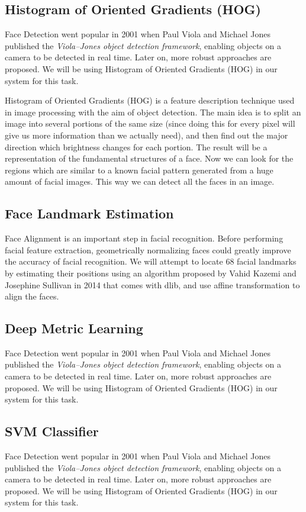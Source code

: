 \subsection{Histogram of Oriented Gradients (HOG)}
Face Detection went popular in 2001 when Paul Viola and Michael Jones published the \emph{Viola–Jones object detection framework},
enabling objects on a camera to be detected in real time. Later on, more robust approaches are proposed. We will be using
Histogram of Oriented Gradients (HOG) in our system for this task.

Histogram of Oriented Gradients (HOG) is a feature description technique used in image processing with the aim of object
detection. The main idea is to split an image into several portions of the same size (since doing this for every pixel will give
us more information than we actually need), and then find out the major direction which brightness changes for each portion.
The result will be a representation of the fundamental structures of a face. Now we can look for the regions which are
similar to a known facial pattern generated from a huge amount of facial images. This way we can detect all the faces
in an image.


\subsection{Face Landmark Estimation}
Face Alignment is an important step in facial recognition. Before performing facial feature extraction, geometrically
normalizing faces could greatly improve the accuracy of facial recognition. We will attempt to locate 68 facial landmarks
by estimating their positions using an algorithm proposed by Vahid Kazemi and Josephine Sullivan in 2014 that comes with dlib,
and use affine transformation to align the faces.

\subsection{Deep Metric Learning}
Face Detection went popular in 2001 when Paul Viola and Michael Jones published the \emph{Viola–Jones object detection framework},
enabling objects on a camera to be detected in real time. Later on, more robust approaches are proposed. We will be using
Histogram of Oriented Gradients (HOG) in our system for this task.

\subsection{SVM Classifier}
Face Detection went popular in 2001 when Paul Viola and Michael Jones published the \emph{Viola–Jones object detection framework},
enabling objects on a camera to be detected in real time. Later on, more robust approaches are proposed. We will be using
Histogram of Oriented Gradients (HOG) in our system for this task.

